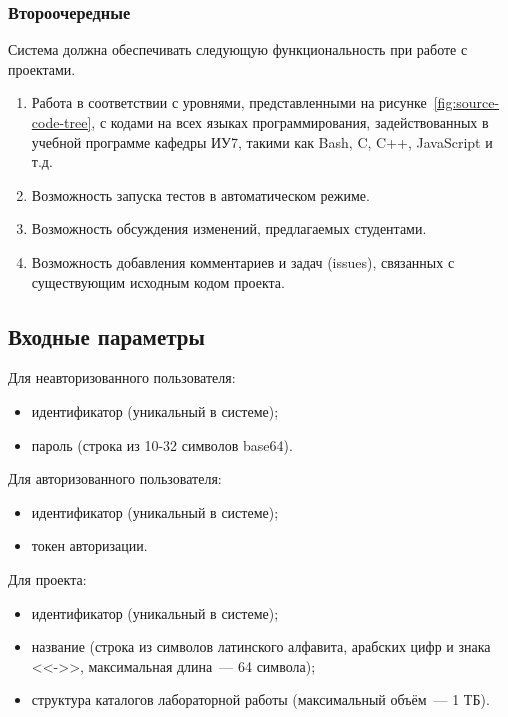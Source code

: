 \documentclass{bmstu}
\begin{document}
  \subsubsection{Второочередные}

  Система должна обеспечивать следующую функциональность при работе с проектами.
  \begin{enumerate}[label*=\arabic*.]
    \item Работа в соответствии с уровнями, представленными на
      рисунке~\ref{fig:source-code-tree}, с кодами на всех языках
      программирования, задействованных в учебной программе кафедры
      ИУ7, такими как Bash, C, C++, JavaScript и т.д.
    \item Возможность запуска тестов в автоматическом режиме.
    \item Возможность обсуждения изменений, предлагаемых студентами.
    \item Возможность добавления комментариев и задач (issues),
      связанных с существующим исходным кодом проекта.
  \end{enumerate}

  \subsection{Входные параметры}

  Для неавторизованного пользователя:
  \begin{itemize}[label=---]
    \item идентификатор (уникальный в системе);
    \item пароль (строка из 10-32 символов base64).
  \end{itemize}

  Для авторизованного пользователя:
  \begin{itemize}[label=---]
    \item идентификатор (уникальный в системе);
    \item токен авторизации.
  \end{itemize}

  Для проекта:
  \begin{itemize}[label=---]
    \item идентификатор (уникальный в системе);
    \item название (строка из символов латинского алфавита, арабских
      цифр и знака <<->>, максимальная длина~--- 64 символа);
    \item структура каталогов лабораторной работы (максимальный
      объём~--- 1 ТБ).
  \end{itemize}
\end{document}

